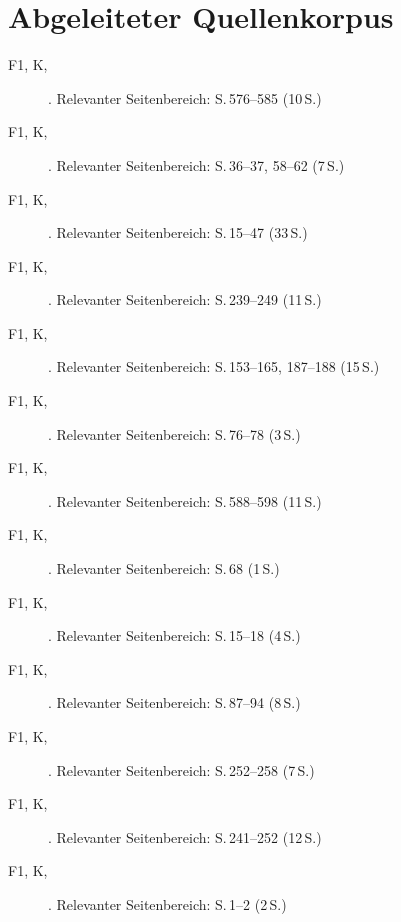 \section*{Abgeleiteter Quellenkorpus}
\begin{description}
  \item[F1, K, \cite{stamm2021fehlenderblick}] . Relevanter Seitenbereich: S.\,576--585 (10\,S.)
  \item[F1, K, \cite{stamm2025vonuntennachoben}] . Relevanter Seitenbereich: S.\,36--37, 58--62 (7\,S.)
  \item[F1, K, \cite{preckel2013hochbegabung}] . Relevanter Seitenbereich: S.\,15--47 (33\,S.)
  \item[F1, K, \cite{gauckreimann2021psychdiagnostik}] . Relevanter Seitenbereich: S.\,239--249 (11\,S.)
  \item[F1, K, \cite{haag2018leistungsstanddiagnostik}] . Relevanter Seitenbereich: S.\,153--165, 187--188 (15\,S.)
  \item[F1, K, \cite{kellerkoller2025hellekoepfe}] . Relevanter Seitenbereich: S.\,76--78 (3\,S.)
  \item[F1, K, \cite{baumschader2021twice}] . Relevanter Seitenbereich: S.\,588--598 (11\,S.)
  \item[F1, K, \cite{koop2025herkunft}] . Relevanter Seitenbereich: S.\,68 (1\,S.)
  \item[F1, K, \cite{stern2025intelligenz}] . Relevanter Seitenbereich: S.\,15--18 (4\,S.)
  \item[F1, K, \cite{webb2020doppeldiagnosen}] . Relevanter Seitenbereich: S.\,87--94 (8\,S.)
  \item[F1, K, \cite{stahl2021mbet}] . Relevanter Seitenbereich: S.\,252--258 (7\,S.)
  \item[F1, K, \cite{warneckehauke2020bildungsgerechtigkeit}] . Relevanter Seitenbereich: S.\,241--252 (12\,S.)
  \item[F1, K, \cite{kellerkoller2013erkennen}] . Relevanter Seitenbereich: S.\,1--2 (2\,S.)

\end{description}
